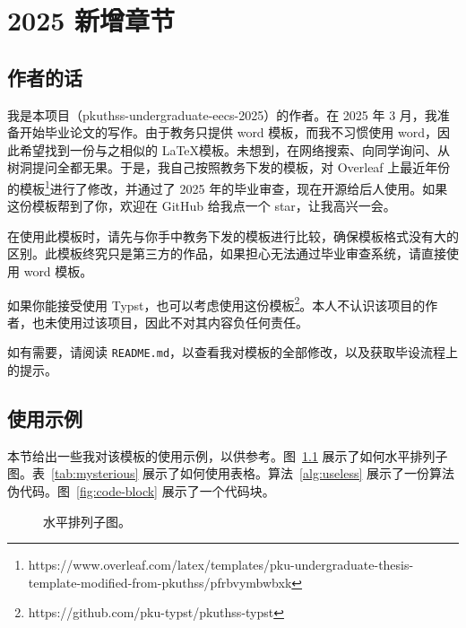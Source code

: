 
\chapter{2025 新增章节}
\label{chap:new-chapter}

\section{作者的话}

我是本项目（pkuthss-undergraduate-eecs-2025）的作者。在 2025 年 3 月，我准备开始毕业论文的写作。由于教务只提供 word 模板，而我不习惯使用 word，因此希望找到一份与之相似的 \LaTeX 模板。未想到，在网络搜索、向同学询问、从树洞提问全都无果。于是，我自己按照教务下发的模板，对 Overleaf 上最近年份的模板\footnote{https://www.overleaf.com/latex/templates/pku-undergraduate-thesis-template-modified-from-pkuthss/pfrbvymbwbxk}进行了修改，并通过了 2025 年的毕业审查，现在开源给后人使用。如果这份模板帮到了你，欢迎在 GitHub 给我点一个 star，让我高兴一会。

在使用此模板时，请先与你手中教务下发的模板进行比较，确保模板格式没有大的区别。此模板终究只是第三方的作品，如果担心无法通过毕业审查系统，请直接使用 word 模板。

如果你能接受使用 Typst，也可以考虑使用这份模板\footnote{https://github.com/pku-typst/pkuthss-typst}。本人不认识该项目的作者，也未使用过该项目，因此不对其内容负任何责任。

如有需要，请阅读 \texttt{README.md}，以查看我对模板的全部修改，以及获取毕设流程上的提示。

\section{使用示例}

本节给出一些我对该模板的使用示例，以供参考。图~\ref{fig:horizontal-subfig} 展示了如何水平排列子图。表~\ref{tab:mysterious} 展示了如何使用表格。算法~\ref{alg:useless} 展示了一份算法伪代码。图~\ref{fig:code-block} 展示了一个代码块。

\begin{figure}[ht]
\centering
{} %
\caption{水平排列子图。}
\label{fig:horizontal-subfig}
\end{figure}

